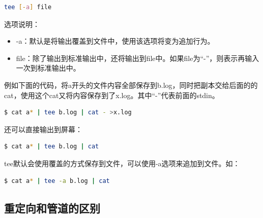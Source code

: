 \documentclass[doctor,openright,twoside]{sjtuthesis}
\providecommand{\tightlist}{%
    \setlength{\itemsep}{0pt}\setlength{\parskip}{0pt}}
\theoremstyle{plain}
\theoremstyle{definition}
\theoremstyle{remark}
\theoremstyle{ocrenumbox}
\theoremstyle{plain}
\begin{document}
\begin{lstlisting}[language=bash]
tee [-a] file
\end{lstlisting}

选项说明：

\begin{itemize}
\tightlist
\item
  -a：默认是将输出覆盖到文件中，使用该选项将变为追加行为。
\item
  file：除了输出到标准输出中，还将输出到file中。如果file为``-''，则表示再输入一次到标准输出中。
\end{itemize}

例如下面的代码，将a开头的文件内容全部保存到b.log，同时把副本交给后面的的cat，使用这个cat又将内容保存到了x.log。其中``-''代表前面的stdin。

\begin{lstlisting}[language=bash]
$ cat a* | tee b.log | cat - >x.log
\end{lstlisting}

还可以直接输出到屏幕：

\begin{lstlisting}[language=bash]
$ cat a* | tee b.log | cat
\end{lstlisting}

tee默认会使用覆盖的方式保存到文件，可以使用-a选项来追加到文件。如：

\begin{lstlisting}[language=bash]
$ cat a* | tee -a b.log | cat
\end{lstlisting}

\hypertarget{section-49}{%
\subsection{重定向和管道的区别}\label{section-49}}
\end{document}
